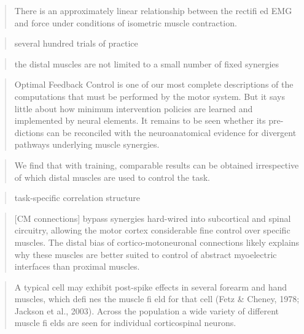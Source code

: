 \begin{quote}
There is an approximately linear relationship between the rectifi ed EMG
and force under conditions of isometric muscle contraction.
\end{quote}

\begin{quote}
several hundred trials of practice
\end{quote}

\begin{quote}
the distal muscles are not limited to a small number of fixed synergies
\end{quote}

\begin{quote}
Optimal Feedback Control is one of our most complete descriptions of the
computations that must be performed by the motor system. But it says
little about how minimum intervention policies are learned and
implemented by neural elements. It remains to be seen whether its
pre-dictions can be reconciled with the neuroanatomical evidence for
divergent pathways underlying muscle synergies.
\end{quote}

\begin{quote}
We find that with training, comparable results can be obtained
irrespective of which distal muscles are used to control the task.
\end{quote}

\begin{quote}
task-specific correlation structure
\end{quote}

\begin{quote}
{[}CM connections{]} bypass synergies hard-wired into subcortical and
spinal circuitry, allowing the motor cortex considerable fine control
over specific muscles. The distal bias of cortico-motoneuronal
connections likely explains why these muscles are better suited to
control of abstract myoelectric interfaces than proximal muscles.
\end{quote}

\begin{quote}
A typical cell may exhibit post-spike effects in several forearm and
hand muscles, which defi nes the muscle fi eld for that cell (Fetz \&
Cheney, 1978; Jackson et al., 2003). Across the population a wide
variety of different muscle fi elds are seen for individual
corticospinal neurons.
\end{quote}

